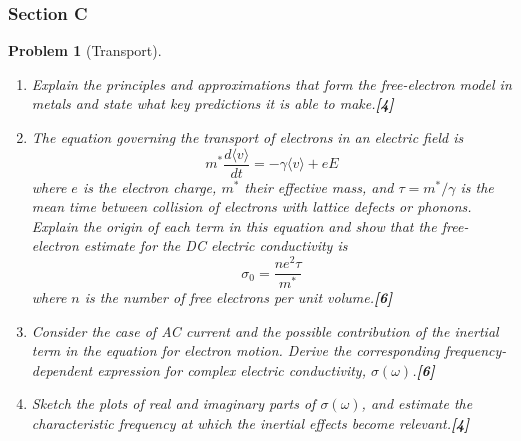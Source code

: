 \documentclass[a4paper]{article}
\theoremstyle{new}
\newtheorem{qns}{Problem}[subsection]
\begin{document}
\subsubsection{Section C}
\begin{qns}[Transport]\leavevmode
\begin{enumerate}[label=(\roman*)]
\item Explain the principles and approximations that form the free-electron model in metals and state what key predictions it is able to make.\hfill\textbf{[4]}
\item The equation governing the transport of electrons in an electric field is
$$m^*\frac{d\langle v\rangle}{dt}=-\gamma\langle v\rangle +eE$$
where $e$ is the electron charge, $m^*$ their effective mass, and $\tau=m^*/\gamma$ is the mean time between collision of electrons with lattice defects or phonons. Explain the origin of each term in this equation and show that the free-electron estimate for the DC electric conductivity is
$$\sigma_0=\frac{ne^2\tau}{m^*}$$
where $n$ is the number of free electrons per unit volume.\hfill\textbf{[6]}
\item Consider the case of AC current and the possible contribution of the inertial term in the equation for electron motion. Derive the corresponding frequency-dependent expression for complex electric conductivity, $\sigma(\omega)$.\hfill\textbf{[6]}
\item Sketch the plots of real and imaginary parts of $\sigma(\omega)$, and estimate the characteristic frequency at which the inertial effects become relevant.\hfill\textbf{[4]}
\end{enumerate}
\begin{mdframed}
\end{mdframed}
\end{qns}
\end{document}

